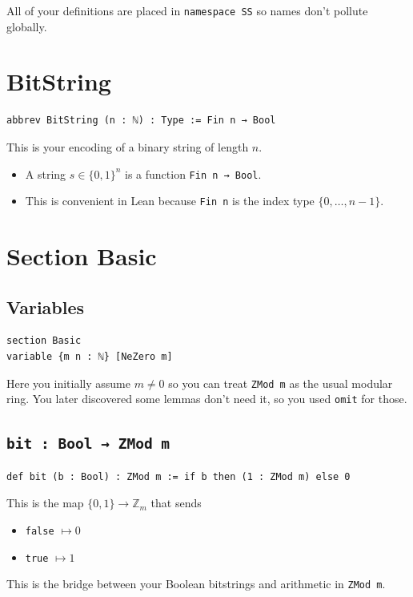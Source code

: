 \documentclass[11pt]{article}
\begin{document}
All of your definitions are placed in \texttt{namespace SS} so names don’t pollute globally.

\section*{BitString}

\begin{lstlisting}
abbrev BitString (n : ℕ) : Type := Fin n → Bool
\end{lstlisting}

This is your encoding of a binary string of length $n$.

\begin{itemize}
\item A string $s\in\{0,1\}^n$ is a function \texttt{Fin n → Bool}.
\item This is convenient in Lean because \texttt{Fin n} is the index type $\{0,\dots,n-1\}$.
\end{itemize}

\section*{Section Basic}

\subsection*{Variables}

\begin{lstlisting}
section Basic
variable {m n : ℕ} [NeZero m]
\end{lstlisting}

Here you initially assume $m\neq 0$ so you can treat \texttt{ZMod m} as the usual modular ring.
You later discovered some lemmas don’t need it, so you used \texttt{omit} for those.

\subsection*{\texttt{bit : Bool → ZMod m}}

\begin{lstlisting}
def bit (b : Bool) : ZMod m := if b then (1 : ZMod m) else 0
\end{lstlisting}

This is the map $\{0,1\}\to\mathbb{Z}_m$ that sends
\begin{itemize}
\item \texttt{false} $\mapsto 0$
\item \texttt{true} $\mapsto 1$
\end{itemize}
This is the bridge between your Boolean bitstrings and arithmetic in \texttt{ZMod m}.
\end{document}
